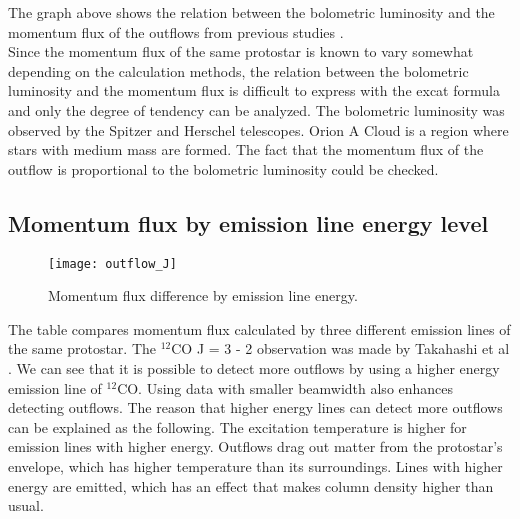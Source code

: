 The graph above shows the relation between the bolometric luminosity and the momentum flux of the outflows from previous studies \cite{takahashi2008millimeter, van2013outflow, hogerheijde1998envelope, nakamura2012evidence, aso2000dense, zhang2005search}. \\ Since the momentum flux of the same protostar is known to vary somewhat depending on the calculation methods\cite{van2013outflow}, the relation between the bolometric luminosity and the momentum flux is difficult to express with the excat formula and only the degree of tendency can be analyzed.
The bolometric luminosity was observed by the Spitzer and Herschel telescopes. Orion A Cloud is a region where stars with medium mass are formed. The fact that the momentum flux of the outflow is proportional to the bolometric luminosity could be checked.

\newpage

\subsection{Momentum flux by emission line energy level}

\begin{figure}[h!]
	\centering
	\texttt{[image: outflow\_J]}
	\caption{Momentum flux difference by emission line energy.}
\end{figure}

The table compares momentum flux calculated by three different emission lines of the same protostar. The $^{12}$CO J = 3 - 2 observation was made by Takahashi et al \cite{takahashi2008millimeter}. We can see that it is possible to detect more outflows by using a higher energy emission line of $^{12}$CO. Using data with smaller beamwidth also enhances detecting outflows. The reason that higher energy lines can detect more outflows can be explained as the following. The excitation temperature is higher for emission lines with higher energy. Outflows drag out matter from the protostar's envelope, which has higher temperature than its surroundings. Lines with higher energy are emitted, which has an effect that makes column density higher than usual.